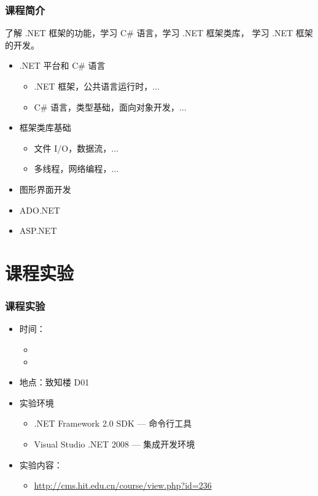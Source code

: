 \begin{frame}
\frametitle{课程简介}

\CJKindent 了解 .NET 框架的功能，学习 C\# 语言，学习 .NET 框架类库， 学习
.NET 框架的开发。

\begin{itemize}
\item .NET 平台和 C\# 语言
\begin{itemize}
\item .NET 框架，公共语言运行时，$\ldots$
\item C\# 语言，类型基础，面向对象开发，$\ldots$
\end{itemize}
\item 框架类库基础
  \begin{itemize}
  \item 文件 I/O，数据流，$\ldots$
  \item 多线程，网络编程，$\ldots$
  \end{itemize}
\item 图形界面开发
\item ADO.NET
\item ASP.NET
\end{itemize}
\end{frame}

\section{课程实验}
\begin{frame}
\frametitle{课程实验}
\begin{itemize}
    \setlength{\itemsep}{14pt plus 1pt}
 \item 时间：%
\begin{itemize}
  \setlength{\itemsep}{6pt plus 1pt}
\item %
\item %
\end{itemize}
\item 地点：致知楼 D01
\item 实验环境
\begin{itemize}
    \setlength{\itemsep}{6pt plus 1pt}
\item .NET Framework 2.0 SDK --- 命令行工具
\item Visual Studio .NET 2008 --- 集成开发环境
\end{itemize}
\item 实验内容：
  \begin{itemize}
  \item \href{http://cms.hit.edu.cn/course/view.php?id=236}{http://cms.hit.edu.cn/course/view.php?id=236}
  \end{itemize}
\end{itemize}

\end{frame}


